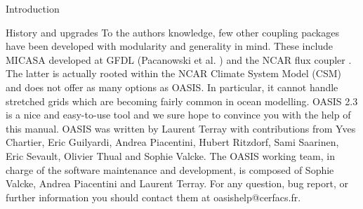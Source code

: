 \begin{section}{Introduction}
\begin{subsection}{History and upgrades}
To the authors knowledge, few other coupling packages have been developed
with modularity and generality in mind. These include MICASA developed at
GFDL (Pacanowski et al. \cite{micasa}) and the NCAR flux coupler 
\cite{ncar}. The latter is actually rooted within the NCAR Climate System Model
(CSM) and does not offer as many options as OASIS. In particular, it cannot
handle stretched grids which are becoming fairly common in ocean modelling.
OASIS 2.3 is a nice and easy-to-use tool and we sure
hope to convince you with the help of this manual. OASIS was written
by Laurent Terray with contributions from Yves Chartier, Eric Guilyardi,
Andrea Piacentini, Hubert Ritzdorf, Sami Saarinen, Eric Sevault, 
Olivier Thual and Sophie Valcke. The
OASIS working team, in charge of the software maintenance and development,
is composed of Sophie Valcke, Andrea Piacentini and Laurent Terray. For any 
question, bug report, or further information you should contact them at 
oasishelp@cerfacs.fr.


\end{subsection}


\end{section}

